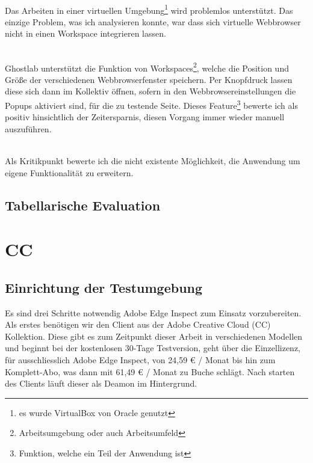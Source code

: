 		\\Das Arbeiten in einer virtuellen Umgebung\footnote{es wurde \Gls{VirtualBox} von Oracle genutzt} wird problemlos unterstützt. Das einzige Problem, was ich analysieren konnte, war dass sich virtuelle \Gls{Webbrowser} nicht in einen \Gls{Workspace} integrieren lassen.

		\\Ghostlab unterstützt die Funktion von \Gls{Workspace}s\footnote{Arbeitsumgebung oder auch Arbeitsumfeld}, welche die Position und Größe der verschiedenen \Gls{Webbrowser}fenster speichern. Per Knopfdruck lassen diese sich dann im Kollektiv öffnen, sofern in den \Gls{Webbrowser}einstellungen die Popups aktiviert sind, für die zu testende Seite. Dieses Feature\footnote{Funktion, welche ein Teil der Anwendung ist} bewerte ich als positiv hinsichtlich der Zeitersparnis, diesen Vorgang immer wieder manuell auszuführen.

		\\Als Kritikpunkt bewerte ich die nicht existente Möglichkeit, die Anwendung um eigene Funktionalität zu erweitern.

		\subsection{Tabellarische Evaluation}
	
	\pagebreak
	\section{ CC }
		\subsection {Einrichtung der Testumgebung}
		Es sind drei Schritte notwendig Adobe Edge Inspect zum Einsatz vorzubereiten. Als erstes benötigen wir den Client aus der Adobe Creative \Gls{Cloud} (CC) Kollektion. Diese gibt es zum Zeitpunkt dieser Arbeit in verschiedenen Modellen und beginnt bei der kostenlosen 30-Tage Testversion, geht über die Einzellizenz, für ausschliesslich Adobe Edge Inspect, von 24,59 € / Monat bis hin zum Komplett-Abo, was dann mit 61,49 € / Monat zu Buche schlägt. Nach starten des Clients läuft dieser als \Gls{Deamon} im Hintergrund. 
		

